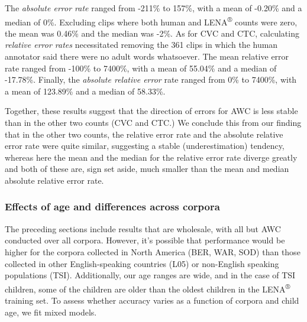 \documentclass[english,table,man,floatsintext]{apa6}
\begin{document}
The \emph{absolute error rate} ranged from -211\% to 157\%, with a mean of -0.20\% and a median of 0\%. Excluding clips where both human and LENA\textsuperscript{®} counts were zero,
the mean was 0.46\% and the median was -2\%. As for CVC and CTC, calculating \emph{relative error rates} necessitated removing the 361 clips in which the human annotator said there were no adult words whatsoever. The mean relative error rate ranged from -100\% to 7400\%, with a mean of 55.04\% and a median of -17.78\%. Finally, the \emph{absolute relative error} rate ranged from 0\% to 7400\%, with a mean of 123.89\% and a median of 58.33\%.

Together, these results suggest that the direction of errors for AWC is less stable than in the other two counts (CVC and CTC.) We conclude this from our finding that in the other two counts, the relative error rate and the absolute relative error rate were quite similar, suggesting a stable (underestimation) tendency, whereas here the mean and the median for the relative error rate diverge greatly and both of these are, sign set aside, much smaller than the mean and median absolute relative error rate.

\hypertarget{effects-of-age-and-differences-across-corpora}{%
\subsubsection{Effects of age and differences across corpora}\label{effects-of-age-and-differences-across-corpora}}

The preceding sections include results that are wholesale, with all but AWC conducted over all corpora. However, it's possible that performance would be higher for the corpora collected in North America (BER, WAR, SOD) than those collected in other English-speaking countries (L05) or non-English speaking populations (TSI). Additionally, our age ranges are wide, and in the case of TSI children, some of the children are older than the oldest children in the LENA\textsuperscript{®} training set. To assess whether accuracy varies as a function of corpora and child age, we fit mixed models.
\end{document}
